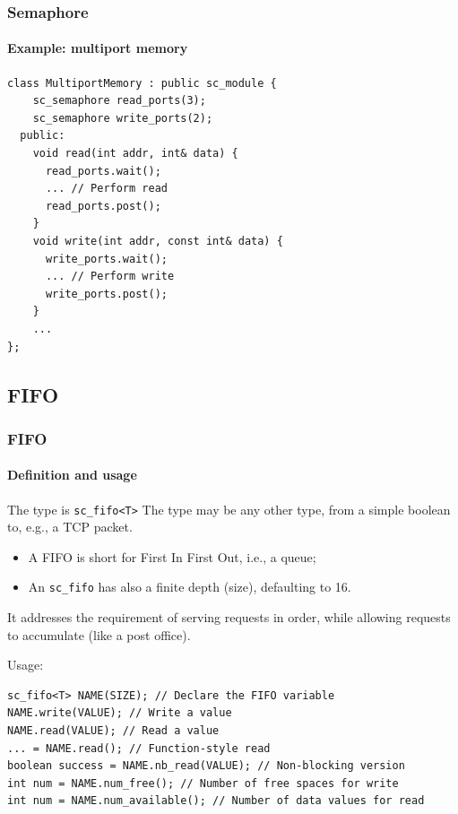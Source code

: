 \begin{frame}[fragile]
\frametitle{Semaphore}
\framesubtitle{Example: multiport memory}

{\scriptsize 
\begin{verbatim}
class MultiportMemory : public sc_module {
    sc_semaphore read_ports(3);
    sc_semaphore write_ports(2);
  public: 
    void read(int addr, int& data) {
      read_ports.wait();
      ... // Perform read
      read_ports.post();
    }
    void write(int addr, const int& data) {
      write_ports.wait();
      ... // Perform write
      write_ports.post();
    }
    ...
};
\end{verbatim}
}

\end{frame}

\subsection{FIFO}

\begin{frame}[fragile]
\frametitle{FIFO}
\framesubtitle{Definition and usage}

\begin{block}{The type is \texttt{sc\_fifo<T>}}
The type may be any other type, from a simple boolean to, e.g., a TCP packet.
\begin{itemize}
\item A FIFO is short for First In First Out, i.e., a queue;
\item An \texttt{sc\_fifo} has also a finite depth (size), defaulting to 16.
\end{itemize}
It addresses the requirement of serving requests in order, while allowing requests to accumulate (like a post office).
\end{block}
\pause
\begin{block}{Usage:}
\vspace{-1em}
{\scriptsize 
\begin{verbatim}
sc_fifo<T> NAME(SIZE); // Declare the FIFO variable
NAME.write(VALUE); // Write a value
NAME.read(VALUE); // Read a value
... = NAME.read(); // Function-style read
boolean success = NAME.nb_read(VALUE); // Non-blocking version
int num = NAME.num_free(); // Number of free spaces for write
int num = NAME.num_available(); // Number of data values for read
\end{verbatim}
}
\vspace{-1em}
\end{block}
\end{frame}

